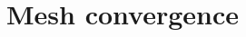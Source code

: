 \documentclass[review,hidelinks,onefignum,onetabnum]{siamart220329}
\newcommand{\bx}{\mathbf{x}}
\newcommand{\by}{\mathbf{y}}
\begin{document}
\section{Mesh convergence}




\end{document}
